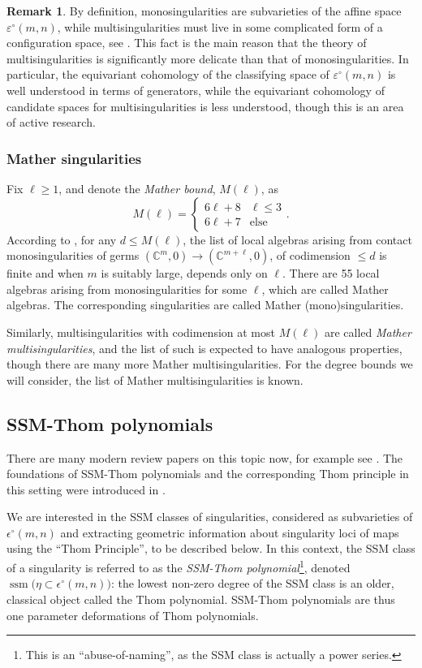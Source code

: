 \documentclass[11pt]{article}
\theoremstyle{plain}
\theoremstyle{definition}
\newtheorem{remark}[fact]{Remark}
\theoremstyle{definition}
\newcommand{\C}{\mathbb{C}}
\DeclareMathOperator{\ssm}{ssm}
\begin{document}
\begin{remark}
By definition, monosingularities are subvarieties of the affine space $\varepsilon^\circ(m,n)$, while multisingularities must live in some complicated form of a configuration space, see \cite{ohm24}. This fact is the main reason that the theory of multisingularities is significantly more delicate than that of monosingularities. In particular, the equivariant cohomology of the classifying space of $\varepsilon^\circ(m,n)$ is well understood in terms of generators, while the equivariant cohomology of candidate spaces for multisingularities is less understood, though this is an area of active research.
\end{remark}

\subsubsection{Mather singularities}
Fix $\ell\geq 1$, and denote the \textit{Mather bound}, $M(\ell)$, as
\[
M(\ell) = \begin{cases} 6\ell+8 & \ell\leq 3\\ 6\ell+7& \text{else}\end{cases}.
\]
According to \cite{mather}, for any $d\leq M(\ell)$, the list of local algebras arising from contact monosingularities of germs $(\C^m,0)\to (\C^{m+\ell},0)$, of codimension $\leq d$ is finite and when $m$ is suitably large, depends only on $\ell$. There are 55 local algebras arising from monosingularities for some $\ell$, which are called Mather algebras. The corresponding singularities are called Mather (mono)singularities. 

Similarly, multisingularities with codimension at most $M(\ell)$ are called \textit{Mather multisingularities}, and the list of such is expected to have analogous properties, though there are many more Mather multisingularities. For the degree bounds we will consider, the list of Mather multisingularities is known. 

\subsection{SSM-Thom polynomials}\label{subsection: ssm-polys}
There are many modern review papers on this topic now, for example see \cite{tpprimer, ohmoverview}. The foundations of SSM-Thom polynomials and the corresponding Thom principle in this setting were introduced in \cite{ohmoto2016}.

We are interested in the SSM classes of singularities, considered as subvarieties of $\epsilon^\circ(m,n)$ and extracting geometric information about singularity loci of maps using the ``Thom Principle'', to be described below. In this context, the SSM class of a singularity is referred to as the \textit{SSM-Thom polynomial}\footnote{This is an ``abuse-of-naming'', as the SSM class is actually a power series.}, denoted $\ssm\big(\eta\subset\epsilon^\circ(m,n)\big)$: the lowest non-zero degree of the SSM class is an older, classical object called the Thom polynomial. SSM-Thom polynomials are thus one parameter deformations of Thom polynomials.
\end{document}
